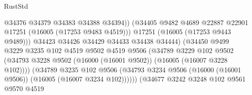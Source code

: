 \begin{lexlean}{RustStd}
\begin{coremodule}
                                            @34376
                                            @34379
                                            @34383
                                            @34388
                                            @34394))
                                        (@34405
                                          @9482
                                          @4689
                                          @22887
                                          @22901
                                          @17251
                                          (@16005 (@17253 @9483 @4519)))
                                        @17251
                                        (@16005 (@17253 @9443 @9489)))
                                      @34423
                                      @34426
                                      @34429
                                      @34433
                                      @34438
                                      @34444)
                                    (@34450
                                      @9499
                                      @3229
                                      @3235
                                      @102
                                      @4519
                                      @9502
                                      @4519
                                      @9506
                                      (@34789
                                        @3229
                                        @102
                                        @9502
                                        (@34793
                                          @3228
                                          @9502
                                          (@16000 (@16001 @9502))
                                          (@16005 (@16007 @3228 @102))))
                                      (@34789
                                        @3235
                                        @102
                                        @9506
                                        (@34793
                                          @3234
                                          @9506
                                          (@16000 (@16001 @9506))
                                          (@16005 (@16007 @3234 @102))))))
                                  (@34677
                                    @3242
                                    @3248
                                    @102
                                    @9561
                                    @9570
                                    @4519

\end{coremodule}
\end{lexlean}
